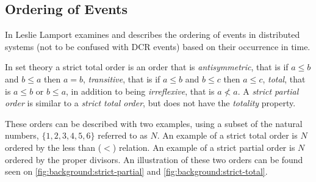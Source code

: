 		\subsection{Ordering of Events}\label{subsec:orderingofevents}
		In \cite{Lamport:1978:TCO:359545.359563} Leslie Lamport examines and describes the ordering of events in distributed systems (not to be confused with DCR events) based on their occurrence in time.

		\newpar In set theory a strict total order is an order that is \textit{antisymmetric}, that is if $a \leq b$ and $b \leq a$ then $a = b$, \textit{transitive}, that is if $a \leq b$ and $b \leq c$ then $a \leq c$, \textit{total}, that is $a \leq b$ or $b \leq a$, in addition to being \textit{irreflexive}, that is $a \not< a$. A \textit{strict partial order} is similar to a \textit{strict total order}, but does not have the \textit{totality} property.
        
		These orders can be described with two examples, using a subset of the natural numbers, $\{1, 2, 3, 4, 5, 6\}$ referred to as $N$. An example of a strict total order is $N$ ordered by the less than ($<$) relation. An example of a strict partial order is $N$ ordered by the proper divisors. An illustration of these two orders can be found seen on \autoref{fig:background:strict-partial} and \autoref{fig:background:strict-total}.
	
